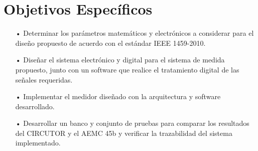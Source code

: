 \section{Objetivos Específicos}
\begin{itemize} 
\item[•]Determinar los parámetros matemáticos y electrónicos a considerar para el diseño propuesto de acuerdo con el estándar IEEE 1459-2010. 

\item[•]	Diseñar el sistema electrónico y digital para el sistema de medida propuesto, junto con un software que realice el tratamiento digital de las señales requeridas.

\item[•] Implementar el medidor diseñado con la arquitectura y software desarrollado.

\item[•] Desarrollar un banco y conjunto de pruebas para comparar los resultados del CIRCUTOR y el AEMC 45b y verificar la trazabilidad del sistema implementado. 
 
\end{itemize}



